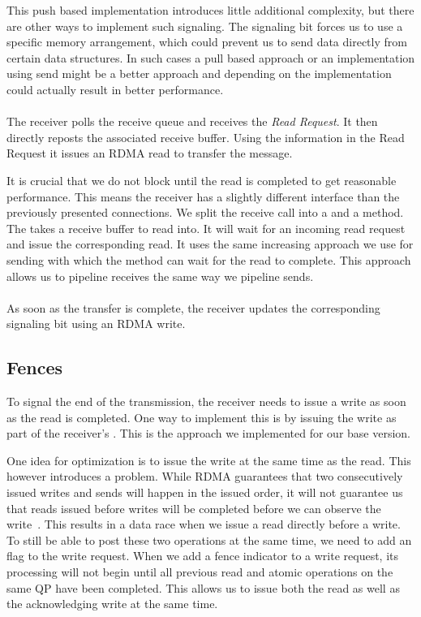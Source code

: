 This push based implementation introduces little additional complexity, but there are other ways to implement such 
signaling. The signaling bit forces us to use a specific memory arrangement, which could prevent us to send data directly 
from certain data structures. In such cases a pull based approach or an implementation using send might be a better approach
and depending on the implementation could actually result in better performance.

\paragraph{} The receiver polls the receive queue and receives the \emph{Read Request}. It then directly reposts the associated 
receive buffer. Using the information in the Read Request it issues an RDMA read to transfer the message. 


It is crucial that we do not block until the read is completed to get reasonable performance.  This means the receiver has a
slightly different interface than the previously presented connections. We split the receive call into a 
 and a  method. The  takes a receive buffer
to read into. It will wait for an incoming read request and issue the corresponding read. It uses the same increasing 
 approach we use for sending with which the  method can wait for the read to complete. This approach
allows us to pipeline receives the same way we pipeline sends.

\paragraph{} As soon as the transfer is complete, the receiver updates the corresponding signaling bit using an RDMA write.

\subsection{Fences}

To signal the end of the transmission, the receiver needs to issue a write as soon as the read is completed. One way to 
implement this is by issuing the write as part of the receiver's . This is the approach we implemented for our
base version.

One idea for optimization is to issue the write at the same time as the read. This however introduces a 
problem. While RDMA guarantees that two consecutively issued writes and sends will happen in the issued order, 
it will not guarantee us that reads issued before writes will be completed before we can observe the write~\cite{rdma-reference}.
This results in a data race when we issue a read directly before a write. To still be able to post these two operations 
at the same time, we need to add an  flag to the write request. When we add a fence indicator to a write
request, its processing will not begin until all previous read and atomic operations on the same QP  have been completed. This 
allows us to issue both the read as well as the acknowledging write at the same time.

